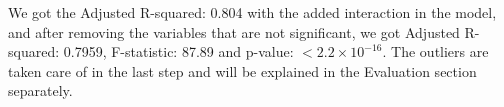 We got the Adjusted R-squared: 0.804 with the added interaction in the model, and after removing the variables that are not significant, we got Adjusted R-squared: 0.7959, F-statistic: 87.89 and p-value: $< 2.2\times 10^{-16}$. The outliers are taken care of in the last step and will be explained in the Evaluation section separately.


